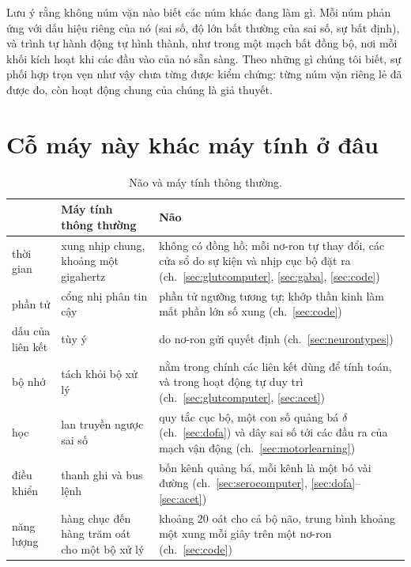 Lưu ý rằng không núm vặn nào biết các núm khác đang làm gì. Mỗi núm phản ứng với dấu hiệu riêng của nó (sai số, độ lớn bất thường của sai số, sự bất định), và trình tự hành động tự hình thành, như trong một mạch bất đồng bộ, nơi mỗi khối kích hoạt khi các đầu vào của nó sẵn sàng. Theo những gì chúng tôi biết, sự phối hợp trọn vẹn như vậy chưa từng được kiểm chứng: từng núm vặn riêng lẻ đã được đo, còn hoạt động chung của chúng là giả thuyết.

\section{Cỗ máy này khác máy tính ở đâu}

\begin{table}[t]
\centering
\footnotesize
\setlength{\tabcolsep}{4pt}
\renewcommand{\arraystretch}{1.15}
\begin{tabular}{>{\raggedright}p{2.2cm}>{\raggedright}p{4.2cm}>{\raggedright\arraybackslash}p{6.6cm}}
\toprule
& Máy tính thông thường & Não \\
\midrule
thời gian & xung nhịp chung, khoảng một gigahertz & không có đồng hồ; mỗi nơ-ron tự thay đổi, các cửa sổ do sự kiện và nhịp cục bộ đặt ra (ch.~\ref{sec:glutcomputer}, \ref{sec:gaba}, \ref{sec:code}) \\
phần tử & cổng nhị phân tin cậy & phần tử ngưỡng tương tự; khớp thần kinh làm mất phần lớn số xung (ch.~\ref{sec:code}) \\
dấu của liên kết & tùy ý & do nơ-ron gửi quyết định (ch.~\ref{sec:neurontypes}) \\
bộ nhớ & tách khỏi bộ xử lý & nằm trong chính các liên kết dùng để tính toán, và trong hoạt động tự duy trì (ch.~\ref{sec:glutcomputer}, \ref{sec:acet}) \\
học & lan truyền ngược sai số & quy tắc cục bộ, một con số quảng bá $\delta$ (ch.~\ref{sec:dofa}) và dây sai số tới các đầu ra của mạch vận động (ch.~\ref{sec:motorlearning}) \\
điều khiển & thanh ghi và bus lệnh & bốn kênh quảng bá, mỗi kênh là một bó vài đường (ch.~\ref{sec:serocomputer}, \ref{sec:dofa}--\ref{sec:acet}) \\
năng lượng & hàng chục đến hàng trăm oát cho một bộ xử lý & khoảng $20$ oát cho cả bộ não, trung bình khoảng một xung mỗi giây trên một nơ-ron (ch.~\ref{sec:code}) \\
\bottomrule
\end{tabular}
\caption{Não và máy tính thông thường.}
\label{tab:computer}
\end{table}

